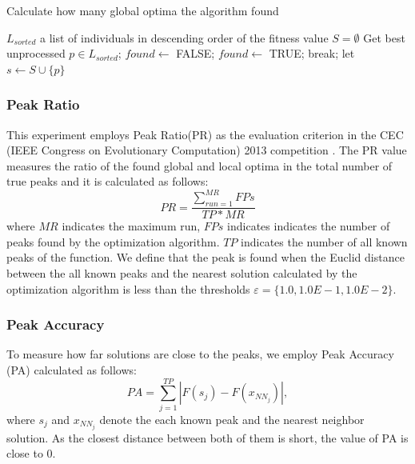 \documentclass[conference]{IEEEtran}
\begin{document}
\begin{algorithm}[H]
\caption{Calculate how many global optima the algorithm found}
\label{code:foptima}
\begin{algorithmic}[2]
\REQUIRE $L_{sorted}$ a list of individuals in descending order of the fitness value
\STATE $S = \emptyset$
\STATE Get best unprocessed $p \in L_{sorted}$;
\STATE $found \leftarrow$ FALSE;
\STATE $found \leftarrow$ TRUE;
\STATE break;
\ENDIF
\ENDFOR
{}
\STATE let $s \leftarrow S \cup \{p\}$
\ENDIF
\ENDIF
\ENDWHILE
\end{algorithmic}
\end{algorithm}

\subsubsection{Peak Ratio}
This experiment employs Peak Ratio(PR) \cite{CDE} as the evaluation criterion in the CEC (IEEE Congress on Evolutionary Computation) 2013 competition \cite{cec2013}. The PR value measures the ratio of the found global and local optima in the total number of true peaks and it is calculated as follows: 
\begin{equation}
\label{eq:PR}
PR=\frac{\sum_{run=1}^{MR}FPs}{TP*MR}
\end{equation}
 where ${MR}$ indicates the maximum run, ${FPs}$ indicates indicates the number of peaks found by the optimization algorithm. ${TP}$ indicates the number of all known peaks of the function. We define that the peak is found when the Euclid distance between the all known peaks and the nearest solution calculated by the optimization algorithm is less than the thresholds $\varepsilon = \{1.0, 1.0E-1, 1.0E-2\}$.

\subsubsection{Peak Accuracy}
To measure how far solutions are close to the peaks, we employ Peak Accuracy (PA) \cite{CDE} calculated as follows:
\begin{equation}
PA=\sum_{j=1}^{TP}|F(s_j)-F(x_{NN_j})|,
\end{equation}
where $s_j$ and $x_{NN_j}$ denote the each known peak and the nearest neighbor solution. As the closest distance between both of them is short, the value of PA is close to 0.  
\end{document}
